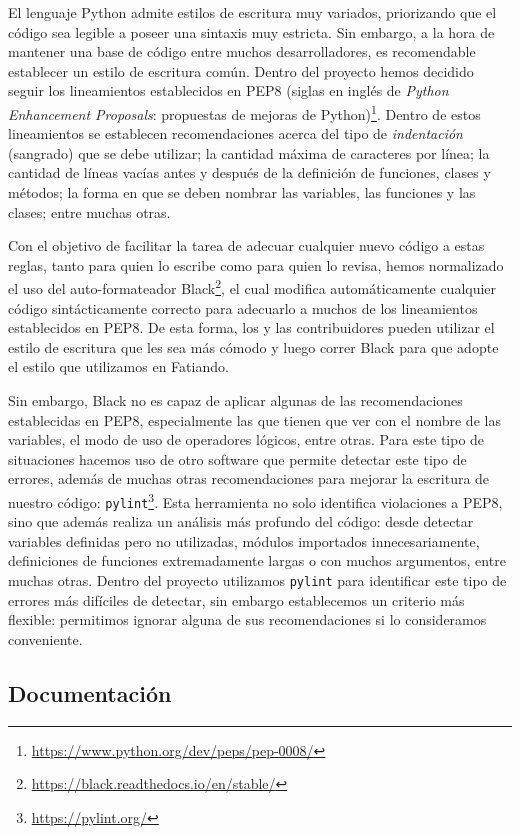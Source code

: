 El lenguaje Python admite estilos de escritura muy variados, priorizando que el
código sea legible a poseer una sintaxis muy estricta.
Sin embargo, a la hora de mantener una base de código entre muchos
desarrolladores, es recomendable establecer un estilo de escritura común.
Dentro del proyecto hemos decidido seguir los lineamientos establecidos en
PEP8 (siglas en inglés de \emph{Python Enhancement Proposals}: propuestas de
mejoras de Python)\footnote{\url{https://www.python.org/dev/peps/pep-0008/}}.
Dentro de estos lineamientos se establecen recomendaciones acerca del tipo de
\emph{indentación} (sangrado) que se debe utilizar; la cantidad máxima de
caracteres por línea; la cantidad de líneas vacías antes y después de la
definición de funciones, clases y métodos; la forma en que se deben nombrar las
variables, las funciones y las clases; entre muchas otras.

Con el objetivo de facilitar la tarea de adecuar cualquier nuevo código a estas
reglas, tanto para quien lo escribe como para quien lo revisa, hemos
normalizado el uso del auto-formateador
Black\footnote{\url{https://black.readthedocs.io/en/stable/}}, el cual modifica
automáticamente cualquier código sintácticamente correcto para adecuarlo
a muchos de los lineamientos establecidos en PEP8.
De esta forma, los y las contribuidores pueden utilizar el estilo de escritura que
les sea más cómodo y luego correr Black para que adopte el estilo que
utilizamos en Fatiando.

Sin embargo, Black no es capaz de aplicar algunas de las recomendaciones
establecidas en PEP8, especialmente las que tienen que ver con el nombre de las
variables, el modo de uso de operadores lógicos, entre otras.
Para este tipo de situaciones hacemos uso de otro software que permite detectar
este tipo de errores, además de muchas otras recomendaciones para mejorar la
escritura de nuestro código:
\texttt{pylint}\footnote{\url{https://pylint.org/}}.
Esta herramienta no solo identifica violaciones a PEP8, sino que además realiza
un análisis más profundo del código: desde detectar variables definidas pero no
utilizadas, módulos importados innecesariamente, definiciones de funciones
extremadamente largas o con muchos argumentos, entre muchas otras.
Dentro del proyecto utilizamos \texttt{pylint} para identificar este tipo de
errores más difíciles de detectar, sin embargo establecemos un criterio más
flexible: permitimos ignorar alguna de sus recomendaciones si lo consideramos
conveniente.

\subsection{Documentación}

